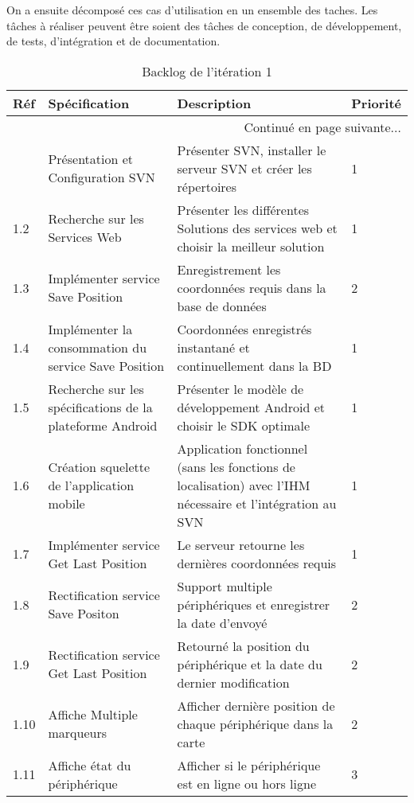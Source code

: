On a ensuite décomposé ces cas d'utilisation en un ensemble des taches. Les
tâches à réaliser peuvent être soient des tâches de conception, de
développement, de tests, d'intégration et de documentation.

\begin{center}
    \footnotesize
    \begin{longtable}{| p{1cm} | p{5cm} | p{7cm} | p{1cm} |}
        \caption{Backlog de l'itération 1}
\label{tab:sprint1-backlog} \\

        \hline
        \textbf{Réf} & \textbf{Spécification} & \textbf{Description} & \textbf{Priorité} \\ \hline
        \endhead

        \hline \multicolumn{4}{|r|}{{Continué en page suivante$\dotsc$}} \\ \hline
        \endfoot

        \hline \hline
        \endlastfoot

        \hline
1.1 & Présentation et Configuration SVN & Présenter SVN, installer le serveur SVN et créer les répertoires & 1 \\ \hline
1.2 & Recherche sur les Services Web & Présenter les différentes Solutions des services web et choisir la meilleur solution & 1 \\ \hline
1.3 & Implémenter service Save Position & Enregistrement les coordonnées requis dans la base de données & 2 \\ \hline
1.4 & Implémenter la consommation du service Save Position & Coordonnées enregistrés instantané et continuellement dans la BD & 1 \\ \hline
1.5 & Recherche sur les spécifications de la plateforme Android & Présenter le modèle de développement Android et choisir le SDK optimale & 1 \\ \hline
1.6 & Création squelette de l'application mobile & Application fonctionnel (sans les fonctions de localisation) avec l'IHM nécessaire et l'intégration au SVN & 1 \\ \hline
1.7 & Implémenter service Get Last Position & Le serveur retourne les dernières coordonnées requis & 1 \\ \hline
1.8 & Rectification service Save Positon & Support multiple périphériques et enregistrer la date d'envoyé & 2 \\ \hline
1.9 & Rectification service Get Last Position & Retourné la position du périphérique et la date du dernier modification & 2 \\ \hline
1.10 & Affiche Multiple marqueurs & Afficher dernière position de chaque périphérique dans la carte & 2 \\ \hline
1.11 & Affiche état du périphérique & Afficher si le périphérique est en ligne ou hors ligne & 3 \\ \hline
    \end{longtable}
\end{center}

